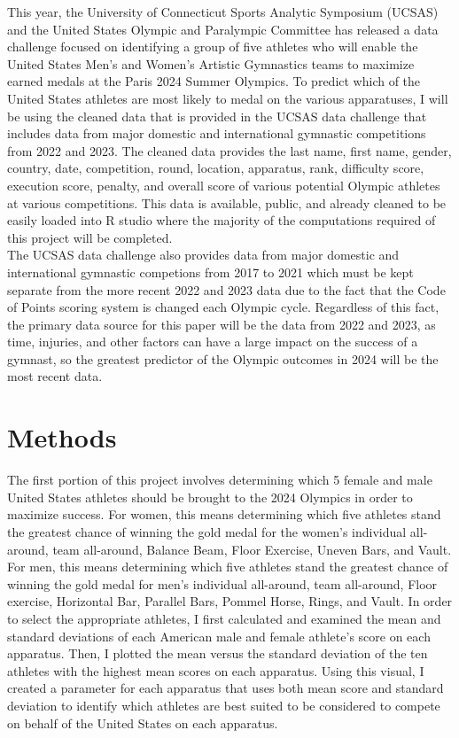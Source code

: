 \documentclass[12pt]{article}
\begin{document}
This year, the University of Connecticut Sports Analytic Symposium (UCSAS) and the United States 
Olympic and Paralympic Committee has released a data challenge focused on identifying a group of 
five athletes who will enable the United States Men's and Women's Artistic Gymnastics teams to 
maximize earned medals at the Paris 2024 Summer Olympics. To predict which of the United States 
athletes are most likely to medal on the various apparatuses, I will be using the cleaned data that 
is provided in the UCSAS data challenge that includes data from major domestic and international 
gymnastic competitions from 2022 and 2023. The cleaned data provides the last name, first name, gender, 
country, date, competition, round, location, apparatus, rank, difficulty score, execution score, penalty, 
and overall score of various potential Olympic athletes at various competitions. This data is available, 
public, and already cleaned to be easily loaded into R studio where the majority of the computations 
required of this project will be completed. 
\\
The UCSAS data challenge also provides data from major domestic
and international gymnastic competions from 2017 to 2021 which must be kept separate from the more recent 2022 
and 2023 data due to the fact that the Code of Points scoring system is changed each Olympic cycle. Regardless 
of this fact, the primary data source for this paper will be the data from 2022 and 2023, as time, injuries, 
and other factors can have a large impact on the success of a gymnast, so the greatest predictor
of the Olympic outcomes in 2024 will be the most recent data.

\section{Methods}
\label{sec:meth}

The first portion of this project involves determining which 5 female and male United States athletes
should be brought to the 2024 Olympics in order to maximize success. For women, this means determining 
which five athletes stand the greatest chance of winning the gold medal for the women's individual all-around,
team all-around, Balance Beam, Floor Exercise, Uneven Bars, and Vault. For men, this means determining
which five athletes stand the greatest chance of winning the gold medal for men's individual all-around, team 
all-around, Floor exercise, Horizontal Bar, Parallel Bars, Pommel Horse, Rings, and Vault. In order 
to select the appropriate athletes, I first calculated and examined the mean and standard 
deviations of each American male and female athlete's score on each apparatus. Then, I plotted the mean 
versus the standard deviation of the ten athletes with the highest mean scores on each apparatus. 
Using this visual, I created a parameter for each apparatus that uses both mean score and standard 
deviation to identify which athletes are best suited to be considered to compete on behalf of the United 
States on each apparatus.
\end{document}
